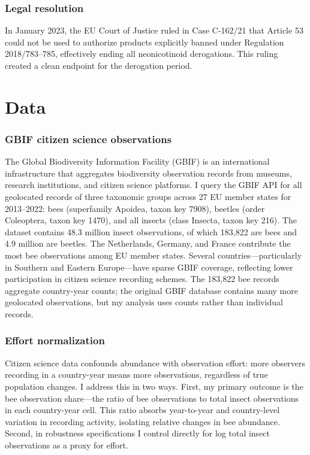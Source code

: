 \documentclass[12pt]{article}
\begin{document}
\subsubsection*{Legal resolution} In January 2023, the EU Court of Justice ruled in Case C-162/21 that Article 53 could not be used to authorize products explicitly banned under Regulation 2018/783--785, effectively ending all neonicotinoid derogations. This ruling created a clean endpoint for the derogation period.

\section{Data}
\label{sec:data}

\subsubsection*{GBIF citizen science observations} The Global Biodiversity Information Facility (GBIF) is an international infrastructure that aggregates biodiversity observation records from museums, research institutions, and citizen science platforms. I query the GBIF API for all geolocated records of three taxonomic groups across 27 EU member states for 2013--2022: bees (superfamily Apoidea, taxon key 7908), beetles (order Coleoptera, taxon key 1470), and all insects (class Insecta, taxon key 216). The dataset contains 48.3 million insect observations, of which 183,822 are bees and 4.9 million are beetles. The Netherlands, Germany, and France contribute the most bee observations among EU member states. Several countries---particularly in Southern and Eastern Europe---have sparse GBIF coverage, reflecting lower participation in citizen science recording schemes. The 183,822 bee records aggregate country-year counts; the original GBIF database contains many more geolocated observations, but my analysis uses counts rather than individual records.

\subsubsection*{Effort normalization} Citizen science data confounds abundance with observation effort: more observers recording in a country-year means more observations, regardless of true population changes. I address this in two ways. First, my primary outcome is the bee observation share---the ratio of bee observations to total insect observations in each country-year cell. This ratio absorbs year-to-year and country-level variation in recording activity, isolating relative changes in bee abundance. Second, in robustness specifications I control directly for log total insect observations as a proxy for effort.
\end{document}
